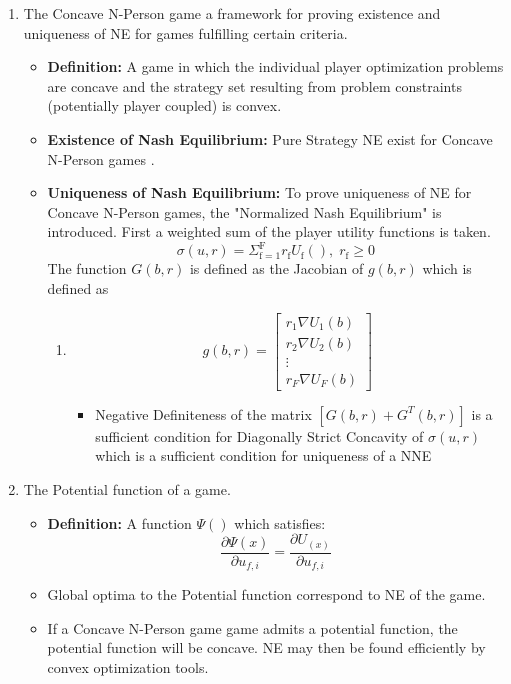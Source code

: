 \documentclass[12pt,a4paper]{report}
\begin{document}
\begin{enumerate}
\item The Concave N-Person game a framework for proving existence and uniqueness of NE for games fulfilling certain criteria.

\begin{itemize}
\item
\textbf{Definition:} A game in which the individual player optimization problems are concave and the strategy set resulting from problem constraints (potentially player coupled) is convex.
\item 
\textbf{Existence of Nash Equilibrium:} Pure Strategy NE exist for Concave N-Person  games \cite[Thm1]{rosen1964existence}. 
\item
\textbf{Uniqueness of Nash Equilibrium:} To prove uniqueness of NE for Concave N-Person  games, the "Normalized Nash Equilibrium" is introduced.
First a weighted sum of the player utility functions is taken.
\begin{equation}
\sigma(u,r)  = \Sigma_{\mathrm{f=1}}^{\mathrm{F}} r_{\mathrm{f}}U_{\mathrm{f}}(), \; 
r_{\mathrm{f}} \geq 0
\end{equation}
 The function $G(b,r) $ is defined as the Jacobian of $g(b,r) $ which is defined as
\begin{enumerate}
\item  
\begin{equation}
g(b,r)= 
\begin{bmatrix}
r_1 \nabla U_{1}(b)
\\
r_2 \nabla U_{2}(b)
\\
\vdots\\
r_F \nabla U_{F}(b)
\end{bmatrix}
\end{equation}

\begin{itemize}
\item
Negative Definiteness of the matrix $[G(b,r)+G^{T}(b,r)] $ is a sufficient condition for Diagonally Strict Concavity of $\sigma(u,r)$ which is a sufficient condition for uniqueness of a NNE \cite[Thm4]{rosen1964existence}

\end{itemize}

\end{enumerate}
\end{itemize}
\item The Potential function of a game.
\begin{itemize}
\item
\textbf{Definition:} A function
$ \Psi()$ which satisfies:
\begin{equation}\label{potential_game_condition}
\frac{\partial \Psi(x)}{\partial u_{f,i}}
 =
 \frac{\partial U_(x)}{\partial u_{f,i}}
\end{equation}
\item Global optima to the Potential function correspond to NE of the game.
\item If a Concave N-Person game game admits a potential function, the potential function will be concave. NE may then be found efficiently by convex optimization tools. 
\end{itemize}




\end{enumerate}
\end{document}
